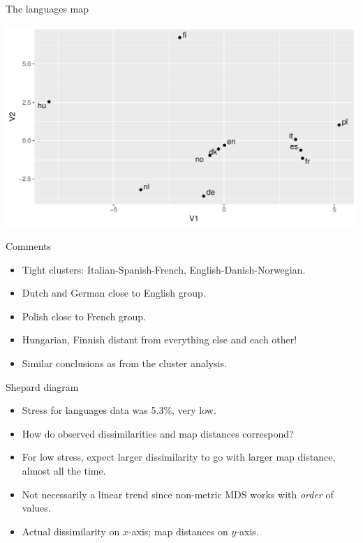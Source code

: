 \begin{frame}[fragile]{The languages map}

\begin{knitrout}
\color{fgcolor}
\includegraphics[width=\maxwidth]{figure/padova-1} 

\end{knitrout}
  
  
  
\end{frame}

\begin{frame}[fragile]{Comments}
  
  \begin{itemize}
  \item Tight clusters: Italian-Spanish-French, English-Danish-Norwegian.
  \item Dutch and German close to English group.
  \item Polish close to French group.
  \item Hungarian, Finnish distant from everything else and each other!
  \item Similar conclusions as from the cluster analysis.
  \end{itemize}
  
\end{frame}

\begin{frame}[fragile]{Shepard diagram}
  
  \begin{itemize}
  \item Stress for languages data was 5.3\%, very low.
  \item How do observed dissimilarities and map distances correspond?
  \item For low stress, expect larger dissimilarity to go with larger
    map distance, almost all the time.
  \item Not necessarily a linear trend since non-metric MDS works with
    \emph{order} of values.
  \item Actual dissimilarity on $x$-axis; map distances on $y$-axis.
  \end{itemize}
  
\end{frame}

